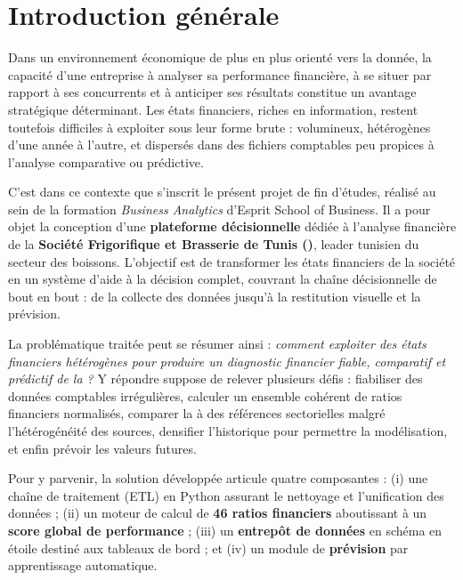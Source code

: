 \chapter*{Introduction générale}

Dans un environnement économique de plus en plus orienté vers la donnée, la
capacité d'une entreprise à analyser sa performance financière, à se situer par
rapport à ses concurrents et à anticiper ses résultats constitue un avantage
stratégique déterminant. Les états financiers, riches en information, restent
toutefois difficiles à exploiter sous leur forme brute : volumineux, hétérogènes
d'une année à l'autre, et dispersés dans des fichiers comptables peu propices à
l'analyse comparative ou prédictive.

\medskip
C'est dans ce contexte que s'inscrit le présent projet de fin d'études, réalisé
au sein de la formation \textit{Business Analytics} d'Esprit School of Business.
Il a pour objet la conception d'une \textbf{plateforme décisionnelle} dédiée à
l'analyse financière de la \textbf{Société Frigorifique et Brasserie de Tunis
(\sfbt)}, leader tunisien du secteur des boissons. L'objectif est de transformer
les états financiers de la société en un système d'aide à la décision complet,
couvrant la chaîne décisionnelle de bout en bout : de la collecte des données
jusqu'à la restitution visuelle et la prévision.

\medskip
La problématique traitée peut se résumer ainsi : \textit{comment exploiter des
états financiers hétérogènes pour produire un diagnostic financier fiable,
comparatif et prédictif de la \sfbt ?} Y répondre suppose de relever plusieurs
défis : fiabiliser des données comptables irrégulières, calculer un ensemble
cohérent de ratios financiers normalisés, comparer la \sfbt à des références
sectorielles malgré l'hétérogénéité des sources, densifier l'historique pour
permettre la modélisation, et enfin prévoir les valeurs futures.

\medskip
Pour y parvenir, la solution développée articule quatre composantes : (i) une
chaîne de traitement (\ac{ETL}) en Python assurant le nettoyage et l'unification
des données ; (ii) un moteur de calcul de \textbf{46 ratios financiers} aboutissant
à un \textbf{score global de performance} ; (iii) un \textbf{entrepôt de données}
en schéma en étoile destiné aux tableaux de bord ; et (iv) un module de
\textbf{prévision} par apprentissage automatique.

